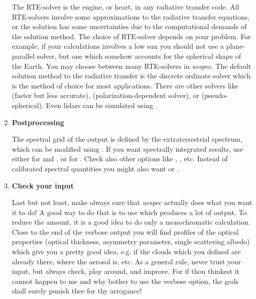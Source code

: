 \begin{enumerate}
  The RTE-solver is the engine, or heart, in any radiative transfer
  code. All RTE-solvers involve some approximations to the radiative
  transfer equations, or the solution has some uncertainties due to
  the computational demands of the solution method. The choice of
  RTE-solver depends on your problem. For example, if your
  calculations involves a low sun you should not use a plane-parallel
  solver, but one which somehow accounts for the spherical shape of
  the Earth. You may choose between many RTE-solvers in
  {\sl uvspec}. The default solution method to the radiative transfer
  is the discrete ordinate solver  which is the method
  of choice for most applications. There are other solvers like
   (faster but less accurate),
   (polarization-dependent solver), or
   (pseudo-spherical). Even
  lidars can be simulated using .
  
\item {\bf Postprocessing}
  
  The spectral grid of the output is defined by the extraterrestrial
  spectrum, which can be modified using .
  If you want spectrally integrated results, use either  
  for  and , 
  or  for .
  Check also other options like , ,
  etc. Instead of calibrated spectral quantities you might also want
   or .
  
\item {\bf Check your input}
  
  Last but not least, make always sure that {\sl uvspec} actually
  does what you want it to do! A good way to do that is to use
   which produces a lot of output. To reduce the amount,
  it is a good idea to do only a monochromatic calculation. Close to the
  end of the verbose output you will find profiles of the optical
  properties (optical thickness, asymmetry parameter, single scattering
  albedo) which give you a pretty good idea, e.g. if the clouds which you
  defined are already there, where the aerosol is, etc. As a general
  rule, never trust your input, but always check, play around, and
  improve. For if thou thinkest it cannot happen to me and why bother to
  use the verbose option, the gods shall surely punish thee for thy
  arrogance!
  
\end{enumerate}

